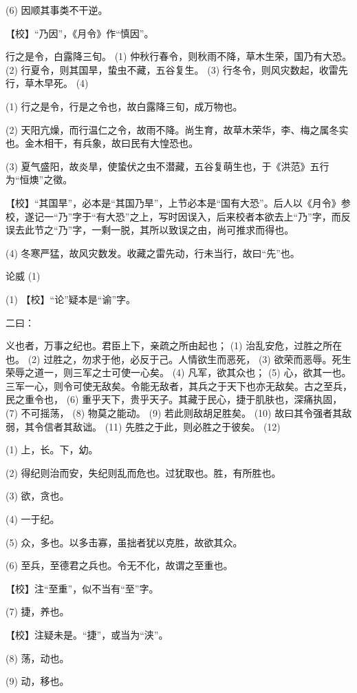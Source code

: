 \documentclass[12pt,UTF8]{ctexbook}
\begin{document}
(6) 因顺其事类不干逆。

【校】“乃因”，《月令》作“慎因”。

行之是令，白露降三旬。 (1) 仲秋行春令，则秋雨不降，草木生荣，国乃有大恐。 (2) 行夏令，则其国旱，蛰虫不藏，五谷复生。 (3) 行冬令，则风灾数起，收雷先行，草木早死。 (4)

(1) 行之是令，行是之令也，故白露降三旬，成万物也。

(2) 天阳亢燥，而行温仁之令，故雨不降。尚生育，故草木荣华，李、梅之属冬实也。金木相干，有兵象，故曰民有大惶恐也。

(3) 夏气盛阳，故炎旱，使蛰伏之虫不潜藏，五谷复萌生也，于《洪范》五行为“恒燠”之徵。

【校】“其国旱”，必本是“其国乃旱”，上节必本是“国有大恐”。后人以《月令》参校，遂记一“乃”字于“有大恐”之上，写时因误入，后来校者本欲去上“乃”字，而反误去此节之“乃”字，一剩一脱，其所以致误之由，尚可推求而得也。

(4) 冬寒严猛，故风灾数发。收藏之雷先动，行未当行，故曰“先”也。





论威 (1)


(1) 【校】“论”疑本是“谕”字。

二曰：

义也者，万事之纪也。君臣上下，亲疏之所由起也； (1) 治乱安危，过胜之所在也。 (2) 过胜之，勿求于他，必反于己。人情欲生而恶死， (3) 欲荣而恶辱。死生荣辱之道一，则三军之士可使一心矣。 (4) 凡军，欲其众也； (5) 心，欲其一也。三军一心，则令可使无敌矣。令能无敌者，其兵之于天下也亦无敌矣。古之至兵，民之重令也， (6) 重乎天下，贵乎天子。其藏于民心，捷于肌肤也，深痛执固， (7) 不可摇荡， (8) 物莫之能动。 (9) 若此则敌胡足胜矣。 (10) 故曰其令强者其敌弱，其令信者其敌诎。 (11) 先胜之于此，则必胜之于彼矣。 (12)

(1) 上，长。下，幼。

(2) 得纪则治而安，失纪则乱而危也。过犹取也。胜，有所胜也。

(3) 欲，贪也。

(4) 一于纪。

(5) 众，多也。以多击寡，虽拙者犹以克胜，故欲其众。

(6) 至兵，至德君之兵也。令无不化，故谓之至重也。

【校】注“至重”，似不当有“至”字。

(7) 捷，养也。

【校】注疑未是。“捷”，或当为“浃”。

(8) 荡，动也。

(9) 动，移也。
\end{document}
